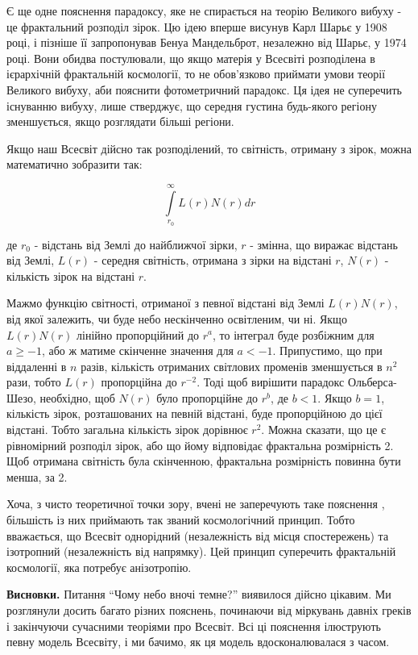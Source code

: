 \documentclass[a4paper]{article}
\begin{document}
Є ще одне пояснення парадоксу, яке не спирається на теорію Великого вибуху - це фрактальний розподіл зірок. Цю ідею вперше висунув Карл Шарьє у 1908 році, і пізніше її запропонував Бенуа Мандельброт, незалежно від Шарьє, у 1974 році. Вони обидва постулювали, що якщо матерія у Всесвіті розподілена в ієрархічній фрактальній космології, то не обов'язково приймати умови теорії Великого вибуху, аби пояснити фотометричний парадокс. Ця ідея не суперечить існуванню вибуху, лише стверджує, що середня густина будь-якого регіону зменшується, якщо розглядати більші регіони. \cite{introduction}

Якщо наш Всесвіт дійсно так розподілений, то світність, отриману з зірок, можна математично зобразити так:

\begin{equation}
\label{fractalLuma}
	\int\limits_{r_{0}}^{\infty}L(r)N(r)dr
\end{equation}

де $r_{0}$ - відстань від Землі до найближчої зірки, $r$ - змінна, що виражає відстань від Землі, $L(r)$ - середня світність, отримана з зірки на відстані $r$, $N(r)$ - кількість зірок на відстані $r$. \cite{introduction}

Мажмо функцію світності, отриманої з певної відстані від Землі $L(r)N(r)$, від якої залежить, чи буде небо нескінченно освітленим, чи ні. Якщо $L(r)N(r)$ лінійно пропорційний до $r^a$, то інтеграл буде розбіжним для $a{\geq}-1$, або ж матиме скінченне значення для $a<-1$. Припустимо, що при віддаленні в $n$ разів, кількість отриманих світлових променів зменшується в $n^2$ рази, тобто $L(r)$ пропорційна до $r^{-2}$. Тоді щоб вирішити парадокс Ольберса-Шезо, необхідно, щоб $N(r)$ було пропорційне до $r^b$, де $b<1$. Якщо $b=1$, кількість зірок, розташованих на певній відстані, буде пропорційною до цієї відстані. Тобто загальна кількість зірок дорівнює $r^2$. Можна сказати, що це є рівномірний розподіл зірок, або що йому відповідає фрактальна розмірність 2. Щоб отримана світність була скінченною, фрактальна розмірність повинна бути менша, за 2.

Хоча, з чисто теоретичної точки зору, вчені не заперечують таке пояснення \cite{relativityFAQ}, більшість із них приймають так званий космологічний принцип. Тобто вважається, що Всесвіт однорідний (незалежність від місця спостережень) та ізотропний (незалежність від напрямку). Цей принцип суперечить фрактальній космології, яка потребує анізотропію. \cite{introduction}

\textbf{Висновки.} Питання ``Чому небо вночі темне?'' виявилося дійсно цікавим. Ми розглянули досить багато різних пояснень, починаючи від міркувань давніх греків і закінчуючи сучасними теоріями про Всесвіт. Всі ці пояснення ілюструють певну модель Всесвіту, і ми бачимо, як ця модель вдосконалювалася з часом.
\end{document}
